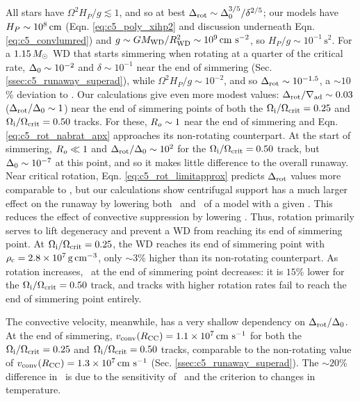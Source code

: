 
\noindent All stars have $\Omega^2 H_P/g \lesssim 1$, and so at best $\dnabrot \sim \dnabconvzero^{3/5}/\delta^{2/5}$; our models have $H_P \sim 10^8\,\mathrm{cm}$ (Eqn. \ref{eq:c5_poly_xihp2} and discussion underneath Eqn. \ref{eq:c5_convlumred}) and $g \sim GM_\mrm{WD}/R_\mrm{WD}^2 \sim 10^9\,\cmpsecsq$, so $H_P/g \sim 10^{-1}\,\mathrm{s}^2$.  For a $1.15\,\Msun$ WD that starts simmering when rotating at a quarter of the critical rate, $\dnabconvzero \sim 10^{-2}$ and $\delta \sim 10^{-1}$ near the end of simmering (Sec. \ref{ssec:c5_runaway_superad}), while $\Omega^2 H_P/g \sim 10^{-2}$, and so $\dnabrot \sim 10^{-1.5}$, a $\sim10$\% deviation to \nablaad.  Our calculations give even more modest values: $\dnabrot/\nablaad \sim 0.03$ ($\dnabrot/\dnabconvzero \sim 1$) near the end of simmering points of both the $\Ominit/\Omcrit = 0.25$ and $\Ominit/\Omcrit = 0.50$ tracks.  For these, $\rossby \sim 1$ near the end of simmering and Eqn. \ref{eq:c5_rot_nabrat_apx} approaches its non-rotating counterpart.  At the start of simmering, $\rossby \ll 1$ and $\dnabrot/\dnabconvzero \sim 10^2$ for the $\Ominit/\Omcrit = 0.50$ track, but $\dnabconvzero \sim 10^{-7}$ at this point, and so it makes little difference to the overall runaway.  Near critical rotation, Eqn. \ref{eq:c5_rot_limitapprox} predicts $\dnabrot$ values more comparable to \nablaad, but our calculations show centrifugal support has a much larger effect on the runaway by lowering both \rhoc\ and \Tc\ of a model with a given \Sc.  This reduces the effect of convective suppression by lowering \vconv.  Thus, rotation primarily serves to lift degeneracy and prevent a WD from reaching its end of simmering point.  At $\Ominit/\Omcrit = 0.25$, the WD reaches its end of simmering point with $\rhoc = 2.8\times10^7\,\gcc$, only $\sim3$\% higher than its non-rotating counterpart.  As rotation increases, \rhoc\ at the end of simmering point decreases: it is $15$\% lower for the $\Ominit/\Omcrit = 0.50$ track, and tracks with higher rotation rates fail to reach the end of simmering point entirely.


The convective velocity, meanwhile, has a very shallow dependency on $\dnabrot/\dnabconvzero$.  At the end of simmering, $\vconvrcc = 1.1\times10^7\,\cmpsec$ for both the $\Ominit/\Omcrit = 0.25$ and $\Ominit/\Omcrit = 0.50$ tracks, comparable to the non-rotating value of $\vconvrcc = 1.3\times10^7\,\cmpsec$ (Sec. \ref{ssec:c5_runaway_superad}).  The $\sim20$\% difference in \vconvrcc\ is due to the sensitivity of \epscc\ and the \citeal{wooswk04} criterion to changes in temperature. 

